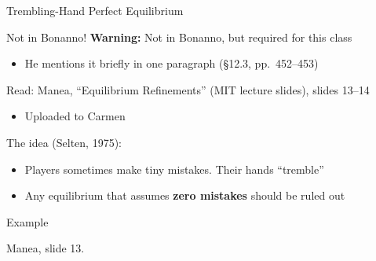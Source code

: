 
\begin{frame}[standout]
Trembling-Hand Perfect Equilibrium
\end{frame}

\begin{frame}{Not in Bonanno!}
\textbf{Warning:} Not in Bonanno, but required for this class
\begin{itemize}
    \item He mentions it briefly in one paragraph (\S12.3, pp.~452--453)
\end{itemize}
\bsk
Read: Manea, ``Equilibrium Refinements'' (MIT lecture slides), slides 13--14
\begin{itemize}
    \item Uploaded to Carmen
\end{itemize}
\bsk
The idea (Selten, 1975):
\begin{itemize}
    \item Players sometimes make tiny mistakes. Their hands ``tremble''
    \item Any equilibrium that assumes \textbf{zero mistakes} should be ruled out
\end{itemize}
\vfill
\vspace{-0.4in}
\end{frame}

\begin{frame}{Example}
\centering
\begin{matrixgame}[top={$L$, $R$}, left={$U$, $D$}, player names={Player 1, Player 2}, w=1.6, br=<2->]
\end{matrixgame}
\bsk
\raggedright
{}
\bsk
{}
\vfill
{\footnotesize Manea, slide 13.}
\vspace{-0.2in}
\end{frame}

